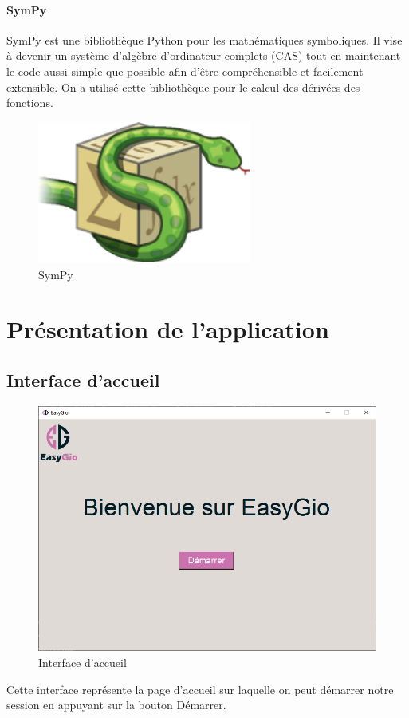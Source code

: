\documentclass[a4paper]{report}
\begin{document}
\subsubsection{SymPy}
SymPy est une bibliothèque Python pour les mathématiques symboliques. Il vise à devenir un système d'algèbre d'ordinateur complets (CAS) tout en maintenant le code aussi simple que possible afin d'être compréhensible et facilement extensible.
On a utilisé cette bibliothèque pour le calcul des dérivées des fonctions.
\begin{figure}[!h]
    \centering
    \includegraphics[width=7cm]{images/SymPy.png}
    \caption{SymPy}
    \label{fig:SymPy}
\end{figure}
\chapter{Présentation de l'application}
\section{Interface d'accueil}
\begin{figure}[!h]
    \centering
    \includegraphics[width=15cm]{images/Interface1.PNG}
    \caption{Interface d'accueil}
    \label{fig:Interface d'accueil}
\end{figure}
Cette interface représente la page d'accueil sur laquelle on peut démarrer notre session en appuyant sur la bouton Démarrer.
\newpage
\end{document}
